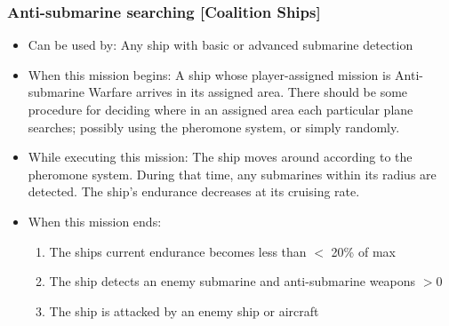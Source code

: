 \documentclass{article}
\begin{document}
    \subsubsection{Anti-submarine searching [Coalition Ships]}
            \begin{itemize}
                \item Can be used by: Any ship with basic or advanced submarine detection
                \item When this mission begins: A ship whose player-assigned mission is Anti-submarine Warfare arrives in its assigned area. There should be some procedure for deciding where in an assigned area each particular plane searches; possibly using the pheromone system, or simply randomly.
                \item While executing this mission: The ship moves around according to the pheromone system. During that time, any submarines within its radius are detected. The ship's endurance decreases at its cruising rate.
                \item When this mission ends:
                    \begin{enumerate}[label=\arabic*)]
                        \item The ships current endurance becomes less than $<$ 20\% of max  \par
                        [Ship mission becomes Transit to Base]
                        \item The ship detects an enemy submarine and anti-submarine weapons $>0$\par
                        [Ship mission becomes Attacking Submarine]
                        \item The ship is attacked by an enemy ship or aircraft \par
                        [Aircraft mission becomes Transit to Base]
                    \end{enumerate}
            \end{itemize}
\end{document}
